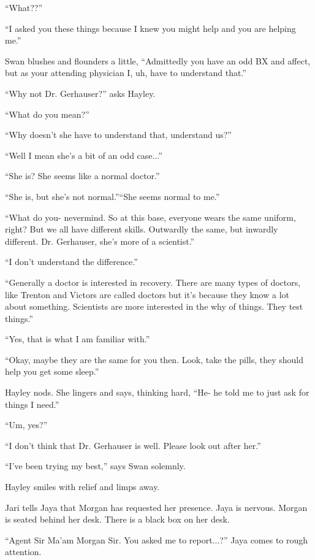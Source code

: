 ``What??''

``I asked you these things because I knew you might help and you are helping me.''

Swan blushes and flounders a little, ``Admittedly you have an odd BX and affect, but as your attending physician I, uh, have to understand that.''

``Why not Dr. Gerhauser?'' asks Hayley.

``What do you mean?''

``Why doesn't she have to understand that, understand us?''

``Well I mean she's a bit of an odd case...''

``She is?  She seems like a normal doctor.''

``She is, but she's not normal.''``She seems normal to me.''

``What do you- nevermind.  So at this base, everyone wears the same uniform, right?  But we all have different skills.  Outwardly the same, but inwardly different.  Dr. Gerhauser, she's more of a scientist.''

``I don't understand the difference.''

``Generally a doctor is interested in recovery.  There are many types of doctors, like Trenton and Victors are called doctors but it's because they know a lot about something.  Scientists are more interested in the why of things.  They test things.''

``Yes, that is what I am familiar with.''

``Okay, maybe they are the same for you then.  Look, take the pills, they should help you get some sleep.''

Hayley nods.  She lingers and says, thinking hard, ``He- he told me to just ask for things I need.''

``Um, yes?''

``I don't think that Dr. Gerhauser is well.  Please look out after her.''

``I've been trying my best,'' says Swan solemnly.

Hayley smiles with relief and limps away.





Jari tells Jaya that Morgan has requested her presence.  Jaya is nervous.  Morgan is seated behind her desk.  There is a black box on her desk.  

``Agent Sir Ma'am Morgan Sir.  You asked me to report...?'' Jaya comes to rough attention.

